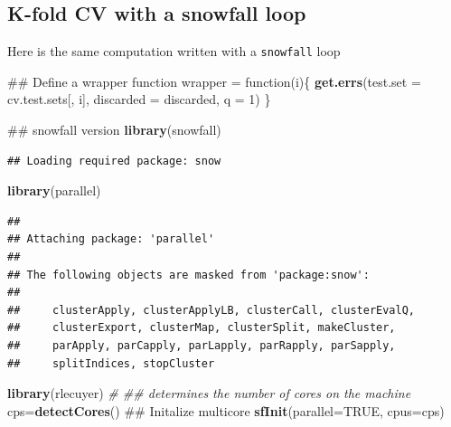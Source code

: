 \documentclass[]{article}
\newenvironment{Shaded}{\begin{snugshade}}{\end{snugshade}}
\newcommand{\KeywordTok}[1]{\textcolor[rgb]{0.13,0.29,0.53}{\textbf{{#1}}}}
\newcommand{\DataTypeTok}[1]{\textcolor[rgb]{0.13,0.29,0.53}{{#1}}}
\newcommand{\DecValTok}[1]{\textcolor[rgb]{0.00,0.00,0.81}{{#1}}}
\newcommand{\StringTok}[1]{\textcolor[rgb]{0.31,0.60,0.02}{{#1}}}
\newcommand{\CommentTok}[1]{\textcolor[rgb]{0.56,0.35,0.01}{\textit{{#1}}}}
\newcommand{\OtherTok}[1]{\textcolor[rgb]{0.56,0.35,0.01}{{#1}}}
\newcommand{\NormalTok}[1]{{#1}}
\begin{document}
\subsection{K-fold CV with a snowfall
loop}\label{k-fold-cv-with-a-snowfall-loop}

Here is the same computation written with a \texttt{snowfall} loop

\begin{Shaded}
\begin{Highlighting}[]
\NormalTok{## Define a wrapper function}
\NormalTok{wrapper =}\StringTok{ }\NormalTok{function(i)\{}
  \KeywordTok{get.errs}\NormalTok{(}\DataTypeTok{test.set =} \NormalTok{cv.test.sets[, i], }\DataTypeTok{discarded =} \NormalTok{discarded, }\DataTypeTok{q =} \DecValTok{1}\NormalTok{)}
\NormalTok{\}}

\NormalTok{## snowfall version}
\KeywordTok{library}\NormalTok{(snowfall)}
\end{Highlighting}
\end{Shaded}

\begin{verbatim}
## Loading required package: snow
\end{verbatim}

\begin{Shaded}
\begin{Highlighting}[]
\KeywordTok{library}\NormalTok{(parallel)}
\end{Highlighting}
\end{Shaded}

\begin{verbatim}
## 
## Attaching package: 'parallel'
## 
## The following objects are masked from 'package:snow':
## 
##     clusterApply, clusterApplyLB, clusterCall, clusterEvalQ,
##     clusterExport, clusterMap, clusterSplit, makeCluster,
##     parApply, parCapply, parLapply, parRapply, parSapply,
##     splitIndices, stopCluster
\end{verbatim}

\begin{Shaded}
\begin{Highlighting}[]
\KeywordTok{library}\NormalTok{(rlecuyer)}
\CommentTok{# ## determines the number of cores on the machine}
\NormalTok{cps=}\KeywordTok{detectCores}\NormalTok{()}
\NormalTok{## Initalize multicore }
\KeywordTok{sfInit}\NormalTok{(}\DataTypeTok{parallel=}\OtherTok{TRUE}\NormalTok{, }\DataTypeTok{cpus=}\NormalTok{cps)}
\end{Highlighting}
\end{Shaded}
\end{document}
